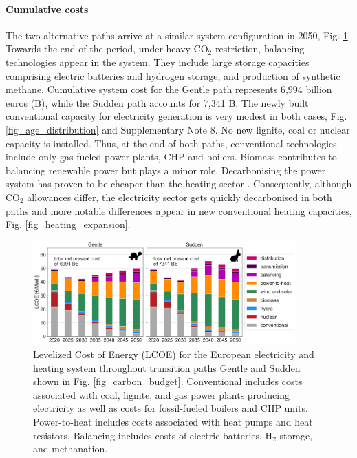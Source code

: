 \documentclass[5p]{elsarticle} %
\begin{document}
\paragraph{\textbf{Cumulative costs}} The two alternative paths arrive at a similar system configuration in 2050, Fig. \ref{fig_system_cost}. Towards the end of the period, under heavy CO$_2$ restriction, balancing technologies appear in the system. They include large storage capacities comprising electric batteries and hydrogen storage, and production of synthetic methane.  Cumulative system cost for the Gentle path represents 6,994 billion euros (B\EUR), while the Sudden path accounts for 7,341 B\EUR. The newly built conventional capacity for electricity generation is very modest in both cases, Fig. \ref{fig_age_distribution} and Supplementary Note 8. No new lignite, coal or nuclear capacity is installed. Thus, at the end of both paths, conventional technologies include only gas-fueled power plants, CHP and boilers. Biomass contributes to balancing renewable power but plays a minor role. Decarbonising the power system has proven to be cheaper than the heating sector \cite{Zhu_2019}. Consequently, although CO$_2$ allowances differ, the electricity sector gets quickly decarbonised in both paths and more notable differences appear in new conventional heating capacities, Fig. \ref{fig_heating_expansion}. %

\begin{figure}[!h]
\centering
\includegraphics[width=0.9\textwidth]{figures/LCOE_Base.png}
\caption{Levelized Cost of Energy (LCOE) for the European electricity and heating system throughout transition paths Gentle and Sudden shown in Fig. \ref{fig_carbon_budget}. Conventional includes costs associated with coal, lignite, and gas power plants producing electricity as well as costs for fossil-fueled boilers and CHP units. Power-to-heat includes costs associated with heat pumps and heat resistors. Balancing includes costs of electric batteries, H$_2$ storage, and methanation.} \label{fig_system_cost} 
\end{figure}
\end{document}

